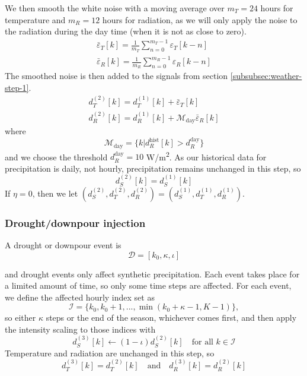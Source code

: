 \documentclass[preprint,12pt]{elsarticle}
\newcommand{\df}[2]{\displaystyle\frac{#1}{#2}}
\begin{document}
We then smooth the white noise with a moving average over $m_{T} = 24$ hours for temperature and $m_{R} = 12$ hours for radiation, as we will only apply the noise to the radiation during the day time (when it is not as close to zero).
\begin{align}
\bar{\varepsilon}_{T}[k] = \df{1}{m_{T}} \sum_{n=0}^{m_{T} - 1} \varepsilon_{T}[k-n] \\
\bar{\varepsilon}_{R}[k] = \df{1}{m_{R}} \sum_{n=0}^{m_{R} - 1} \varepsilon_{R}[k-n]
\label{eqn:smooth-noise}
\end{align}
The smoothed noise is then added to the signals from section \ref{subsubsec:weather-step-1}.
\begin{align}
d_{T}^{(2)}[k] = d_{T}^{(1)}[k] + \bar{\varepsilon}_{T}[k] \\
d_{R}^{(2)}[k] = d_{R}^{(1)}[k] + \mathcal{M}_{\text{day}}\bar{\varepsilon}_{R}[k]
\label{eqn:add-noise}
\end{align}
where
\begin{equation}
\mathcal{M}_{\text{day}} = \{ k | d_{R}^{\text{hist}}[k] > d_{R}^{\text{day}} \}
\label{eqn:daymask}
\end{equation}
and we choose the threshold $d_{R}^{\text{day}} = 10$ W/m\textsuperscript{2}. As our historical data for precipitation is daily, not hourly, precipitation remains unchanged in this step, so
\begin{equation}
d_{S}^{(2)}[k] = d_{S}^{(1)}[k]
\label{eqn:P2-P1}
\end{equation}
If $\eta = 0$, then we let $(d_{S}^{(2)}, d_{T}^{(2)}, d_{R}^{(2)}) = (d_{S}^{(1)}, d_{T}^{(1)}, d_{R}^{(1)})$.

\subsubsection{Drought/downpour injection}\label{subsubsec:drought-injection}

A drought or downpour event is
\begin{equation}
\mathcal{D} = [k_{0}, \kappa, \iota]
\label{eqn:drought-event}
\end{equation}

and drought events only affect synthetic precipitation. Each event takes place for a limited amount of time, so only some time steps are affected. For each event, we define the affected hourly index set as
\begin{equation}
\mathcal{I} = \{ k_{0}, k_{0}+1,...,\min(k_{0} + \kappa - 1, K-1) \},
\label{eqn:affected-indices}
\end{equation}
so either $\kappa$ steps or the end of the season, whichever comes first, and then apply the intensity scaling to those indices with
\begin{equation}
d_{S}^{(3)}[k] \leftarrow (1 - \iota)d_{S}^{(2)}[k] \quad \text{for all } k\in\mathcal{I}
\label{eqn:P3}
\end{equation}
Temperature and radiation are unchanged in this step, so
\begin{equation}
d_{T}^{(3)}[k] = d_{T}^{(2)}[k] \quad \text{and} \quad d_{R}^{(3)}[k] = d_{R}^{(2)}[k]
\label{eqn:T3R3-T2R2}
\end{equation}
\end{document}
